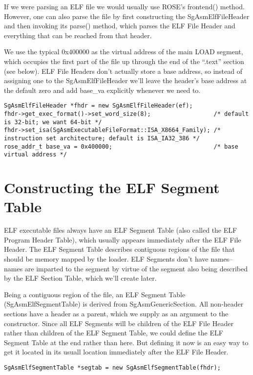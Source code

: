 If we were parsing an ELF file we would usually use ROSE's frontend()
method. However, one can also parse the file by first constructing the
SgAsmElfFileHeader and then invoking its parse() method, which parses
the ELF File Header and everything that can be reached from that
header.

We use the typical 0x400000 as the virtual address of the main LOAD
segment, which occupies the first part of the file up through the end
of the ``.text'' section (see below). ELF File Headers don't actually
store a base address, so instead of assigning one to the
SgAsmElfFileHeader we'll leave the header's base address at the
default zero and add base_va explicitly whenever we need to.

\begin{verbatim}
SgAsmElfFileHeader *fhdr = new SgAsmElfFileHeader(ef);
fhdr->get_exec_format()->set_word_size(8);                  /* default is 32-bit; we want 64-bit */
fhdr->set_isa(SgAsmExecutableFileFormat::ISA_X8664_Family); /* instruction set architecture; default is ISA_IA32_386 */
rose_addr_t base_va = 0x400000;                             /* base virtual address */
\end{verbatim}

\section{Constructing the ELF Segment Table}

ELF executable files always have an ELF Segment Table (also called the
ELF Program Header Table), which usually appears immediately after the
ELF File Header. The ELF Segment Table describes contiguous regions of
the file that should be memory mapped by the loader. ELF Segments
don't have names--names are imparted to the segment by virtue of the
segment also being described by the ELF Section Table, which we'll
create later.

Being a contiguous region of the file, an ELF Segment Table
(SgAsmElfSegmentTable) is derived from SgAsmGenericSection. All
non-header sections have a header as a parent, which we supply as an
argument to the constructor. Since all ELF Segments will be children of
the ELF File Header rather than children of the ELF Segment Table, we
could define the ELF Segment Table at the end rather than here. But
defining it now is an easy way to get it located in its usuall
location immediately after the ELF File Header.

\begin{verbatim}
SgAsmElfSegmentTable *segtab = new SgAsmElfSegmentTable(fhdr);
\end{verbatim}

